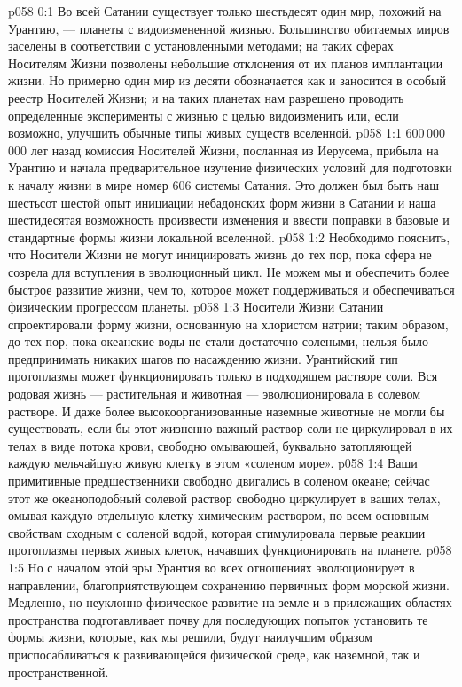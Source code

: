 \author{Носитель Жизни}
\vs p058 0:1 Во всей Сатании существует только шестьдесят один мир, похожий на Урантию, --- планеты с видоизмененной жизнью. Большинство обитаемых миров заселены в соответствии с установленными методами; на таких сферах Носителям Жизни позволены небольшие отклонения от их планов имплантации жизни. Но примерно один мир из десяти обозначается как  и заносится в особый реестр Носителей Жизни; и на таких планетах нам разрешено проводить определенные эксперименты с жизнью с целью видоизменить или, если возможно, улучшить обычные типы живых существ вселенной.
\vs p058 1:1 600\,000\,000 лет назад комиссия Носителей Жизни, посланная из Иерусема, прибыла на Урантию и начала предварительное изучение физических условий для подготовки к началу жизни в мире номер 606 системы Сатания. Это должен был быть наш шестьсот шестой опыт инициации небадонских форм жизни в Сатании и наша шестидесятая возможность произвести изменения и ввести поправки в базовые и стандартные формы жизни локальной вселенной.
\vs p058 1:2 \pc Необходимо пояснить, что Носители Жизни не могут инициировать жизнь до тех пор, пока сфера не созрела для вступления в эволюционный цикл. Не можем мы и обеспечить более быстрое развитие жизни, чем то, которое может поддерживаться и обеспечиваться физическим прогрессом планеты.
\vs p058 1:3 Носители Жизни Сатании спроектировали форму жизни, основанную на хлористом натрии; таким образом, до тех пор, пока океанские воды не стали достаточно солеными, нельзя было предпринимать никаких шагов по насаждению жизни. Урантийский тип протоплазмы может функционировать только в подходящем растворе соли. Вся родовая жизнь --- растительная и животная --- эволюционировала в солевом растворе. И даже более высокоорганизованные наземные животные не могли бы существовать, если бы этот жизненно важный раствор соли не циркулировал в их телах в виде потока крови, свободно омывающей, буквально затопляющей каждую мельчайшую живую клетку в этом «соленом море».
\vs p058 1:4 Ваши примитивные предшественники свободно двигались в соленом океане; сейчас этот же океаноподобный солевой раствор свободно циркулирует в ваших телах, омывая каждую отдельную клетку химическим раствором, по всем основным свойствам сходным с соленой водой, которая стимулировала первые реакции протоплазмы первых живых клеток, начавших функционировать на планете.
\vs p058 1:5 Но с началом этой эры Урантия во всех отношениях эволюционирует в направлении, благоприятствующем сохранению первичных форм морской жизни. Медленно, но неуклонно физическое развитие на земле и в прилежащих областях пространства подготавливает почву для последующих попыток установить те формы жизни, которые, как мы решили, будут наилучшим образом приспосабливаться к развивающейся физической среде, как наземной, так и пространственной.
